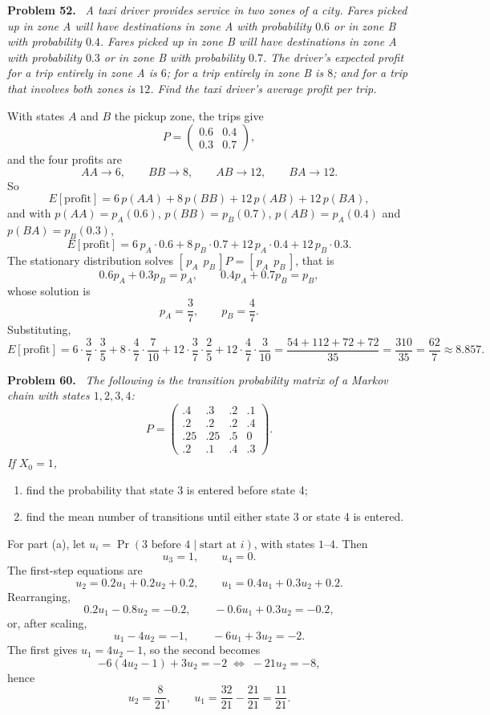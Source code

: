 \documentclass[11pt]{article}
\newenvironment{problem}[1]
  {\par\medskip\noindent\textbf{Problem #1.}\ \itshape}
  {\par\medskip}
\begin{document}
\begin{problem}{52}
A taxi driver provides service in two zones of a city. Fares picked up in zone A will have destinations in zone A with probability $0.6$ or in zone B with probability $0.4$. Fares picked up in zone B will have destinations in zone A with probability $0.3$ or in zone B with probability $0.7$. The driver's expected profit for a trip entirely in zone A is $6$; for a trip entirely in zone B is $8$; and for a trip that involves both zones is $12$. Find the taxi driver's average profit per trip.
\end{problem}
With states $A$ and $B$ the pickup zone, the trips give
\[
P=\begin{pmatrix}0.6&0.4\\0.3&0.7\end{pmatrix},
\]
and the four profits are
\[
AA\to 6,\qquad BB\to 8,\qquad AB\to 12,\qquad BA\to 12.
\]
So
\[
E[\text{profit}]=6\,p(AA)+8\,p(BB)+12\,p(AB)+12\,p(BA),
\]
and with $p(AA)=p_A(0.6)$, $p(BB)=p_B(0.7)$, $p(AB)=p_A(0.4)$ and $p(BA)=p_B(0.3)$,
\[
E[\text{profit}]=6\,p_A\cdot 0.6+8\,p_B\cdot 0.7+12\,p_A\cdot 0.4+12\,p_B\cdot 0.3.
\]
The stationary distribution solves $[\,p_A\ \ p_B\,]P=[\,p_A\ \ p_B\,]$, that is
\[
0.6p_A+0.3p_B=p_A,\qquad 0.4p_A+0.7p_B=p_B,
\]
whose solution is
\[
p_A=\frac{3}{7},\qquad p_B=\frac{4}{7}.
\]
Substituting,
\[
E[\text{profit}]=6\cdot\frac37\cdot\frac35+8\cdot\frac47\cdot\frac{7}{10}+12\cdot\frac37\cdot\frac25+12\cdot\frac47\cdot\frac{3}{10}
=\frac{54+112+72+72}{35}=\frac{310}{35}=\frac{62}{7}\approx 8.857.
\]

\begin{problem}{60}
The following is the transition probability matrix of a Markov chain with states $1,2,3,4$:
\[
P=\begin{pmatrix}.4&.3&.2&.1\\ .2&.2&.2&.4\\ .25&.25&.5&0\\ .2&.1&.4&.3\end{pmatrix}.
\]
If $X_0=1$,
\begin{enumerate}
\item[(a)] find the probability that state 3 is entered before state 4;
\item[(b)] find the mean number of transitions until either state 3 or state 4 is entered.
\end{enumerate}
\end{problem}
For part (a), let $u_i=\Pr(3\text{ before }4\mid \text{start at }i)$, with states $1$--$4$. Then
\[
u_3=1,\qquad u_4=0.
\]
The first-step equations are
\[
u_2=0.2u_1+0.2u_2+0.2,\qquad u_1=0.4u_1+0.3u_2+0.2.
\]
Rearranging,
\[
0.2u_1-0.8u_2=-0.2,\qquad -0.6u_1+0.3u_2=-0.2,
\]
or, after scaling,
\[
u_1-4u_2=-1,\qquad -6u_1+3u_2=-2.
\]
The first gives $u_1=4u_2-1$, so the second becomes
\[
-6(4u_2-1)+3u_2=-2 \;\Longleftrightarrow\; -21u_2=-8,
\]
hence
\[
u_2=\frac{8}{21},\qquad u_1=\frac{32}{21}-\frac{21}{21}=\frac{11}{21}.
\]
\end{document}
